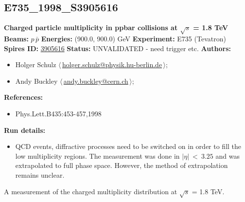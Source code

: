 \clearpage

\subsection[E735\_1998\_S3905616]{E735\_1998\_S3905616\,\cite{Alexopoulos:1998bi}}
\textbf{Charged particle multiplicity in ppbar collisions at \ensuremath{\sqrt{s}} = 1.8 TeV}\newline
\textbf{Beams:} $p$\,$\bar{p}$ \newline
\textbf{Energies:} (900.0, 900.0) GeV \newline
\textbf{Experiment:} E735 (Tevatron) \newline
\textbf{Spires ID:} \href{http://www.slac.stanford.edu/spires/find/hep/www?rawcmd=key+3905616}{3905616}\newline
\textbf{Status:} UNVALIDATED - need trigger etc.\newline
\textbf{Authors:}
\begin{itemize}
  \item Holger Schulz $\langle\,$\href{mailto:holger.schulz@physik.hu-berlin.de}{holger.schulz@physik.hu-berlin.de}$\,\rangle$;
  \item Andy Buckley $\langle\,$\href{mailto:andy.buckley@cern.ch}{andy.buckley@cern.ch}$\,\rangle$;
\end{itemize}
\textbf{References:}
\begin{itemize}
  \item Phys.Lett.B435:453-457,1998
\end{itemize}
\textbf{Run details:}
\begin{itemize}

  \item QCD events, diffractive processes need to be switched on in order to fill the low multiplicity regions. The measurement was done in $\left|\eta\right| ~< ~3.25$ and was extrapolated to full phase space. However, the method of extrapolation remains unclear.\end{itemize}

\noindent A measurement of the charged multiplicity distribution at \ensuremath{\sqrt{s}} = 1.8 TeV.

\clearpage


